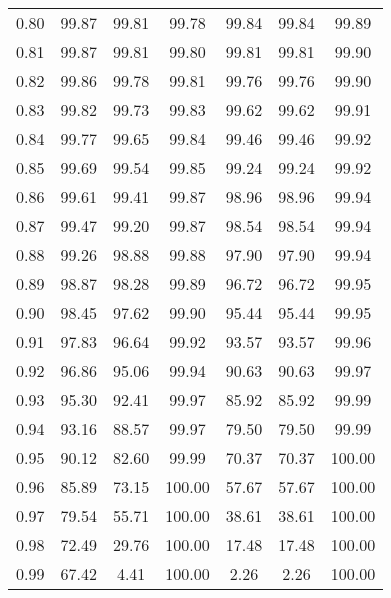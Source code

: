 \begin{tabular}{|c|c|c|c|c|c|c|}
      0.80 &     99.87 &     99.81 &      99.78 &   99.84 &      99.84 &         99.89 \\
      0.81 &     99.87 &     99.81 &      99.80 &   99.81 &      99.81 &         99.90 \\
      0.82 &     99.86 &     99.78 &      99.81 &   99.76 &      99.76 &         99.90 \\
      0.83 &     99.82 &     99.73 &      99.83 &   99.62 &      99.62 &         99.91 \\
      0.84 &     99.77 &     99.65 &      99.84 &   99.46 &      99.46 &         99.92 \\
      0.85 &     99.69 &     99.54 &      99.85 &   99.24 &      99.24 &         99.92 \\
      0.86 &     99.61 &     99.41 &      99.87 &   98.96 &      98.96 &         99.94 \\
      0.87 &     99.47 &     99.20 &      99.87 &   98.54 &      98.54 &         99.94 \\
      0.88 &     99.26 &     98.88 &      99.88 &   97.90 &      97.90 &         99.94 \\
      0.89 &     98.87 &     98.28 &      99.89 &   96.72 &      96.72 &         99.95 \\
      0.90 &     98.45 &     97.62 &      99.90 &   95.44 &      95.44 &         99.95 \\
      0.91 &     97.83 &     96.64 &      99.92 &   93.57 &      93.57 &         99.96 \\
      0.92 &     96.86 &     95.06 &      99.94 &   90.63 &      90.63 &         99.97 \\
      0.93 &     95.30 &     92.41 &      99.97 &   85.92 &      85.92 &         99.99 \\
      0.94 &     93.16 &     88.57 &      99.97 &   79.50 &      79.50 &         99.99 \\
      0.95 &     90.12 &     82.60 &      99.99 &   70.37 &      70.37 &        100.00 \\
      0.96 &     85.89 &     73.15 &     100.00 &   57.67 &      57.67 &        100.00 \\
      0.97 &     79.54 &     55.71 &     100.00 &   38.61 &      38.61 &        100.00 \\
      0.98 &     72.49 &     29.76 &     100.00 &   17.48 &      17.48 &        100.00 \\
      0.99 &     67.42 &      4.41 &     100.00 &    2.26 &       2.26 &        100.00 \\
\bottomrule
\end{tabular}
